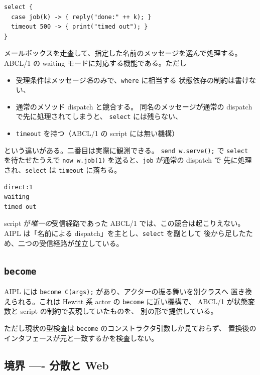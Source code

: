 \documentclass[11pt,a4paper]{ltjsarticle}
\theoremstyle{remark}
\begin{document}
\begin{lstlisting}[language=AIPL]
select {
  case job(k) -> { reply("done:" ++ k); }
  timeout 500 -> { print("timed out"); }
}
\end{lstlisting}

メールボックスを走査して、指定した名前のメッセージを選んで処理する。
ABCL/1 の waiting モードに対応する機能である。ただし

\begin{itemize}
\item 受理条件はメッセージ\emph{名}のみで、\texttt{where} に相当する
  状態依存の制約は書けない、
\item 通常のメソッド dispatch と競合する。
  同名のメッセージが通常の dispatch で先に処理されてしまうと、
  \texttt{select} には残らない、
\item \texttt{timeout} を持つ（ABCL/1 の script には無い機構）
\end{itemize}

という違いがある。二番目は実際に観測できる。
\texttt{send w.serve();} で \texttt{select} を待たせたうえで
\texttt{now w.job(1)} を送ると、\texttt{job} が通常の dispatch で
先に処理され、\texttt{select} は \texttt{timeout} に落ちる。

\begin{lstlisting}[language={}]
direct:1
waiting
timed out
\end{lstlisting}

script が\emph{唯一の}受信経路であった ABCL/1 では、この競合は起こりえない。
AIPL は「名前による dispatch」を主とし、\texttt{select} を副として
後から足したため、二つの受信経路が並立している。

\subsection{\texttt{become}}

AIPL には \texttt{become C(args);} があり、アクターの振る舞いを別クラスへ
置き換えられる。これは Hewitt 系 actor の \texttt{become} に近い機構で、
ABCL/1 が状態変数と script の制約で表現していたものを、
別の形で提供している。

ただし現状の型検査は \texttt{become} のコンストラクタ引数しか見ておらず、
置換後のインタフェースが元と一致するかを検査しない。

\subsection{境界 ---- 分散と Web}
\end{document}

